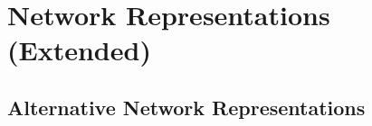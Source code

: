 \chapter{Network Representations (Extended)}
\label{app:ch11}
\section{Alternative Network Representations}
\label{app:ch11:alt-reps}
